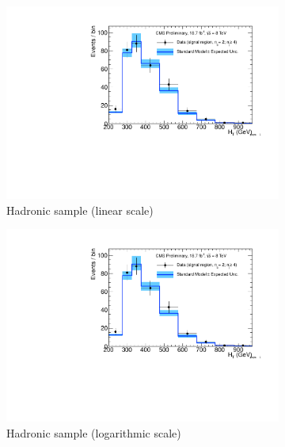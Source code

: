 \clearpage
\begin{figure}[h!]
  \centering
  \begin{subfigure}[b]{0.48\textwidth}
    \includegraphics[width=\textwidth,page=1]
    {Figs/results/v0/blueBand/bestFit_2012dev_RQcdZero_fZinvAll_2b_ge4j-1h_smOnly}
    \caption{Hadronic sample (linear scale)}
  \end{subfigure}
  \begin{subfigure}[b]{0.48\textwidth}
    \includegraphics[width=\textwidth,page=2]
    {Figs/results/v0/blueBand/bestFit_2012dev_RQcdZero_fZinvAll_2b_ge4j-1h_smOnly}
    \caption{Hadronic sample (logarithmic scale)}
  \end{subfigure}
  \begin{subfigure}[b]{0.48\textwidth}

\end{subfigure}
\end{figure}
